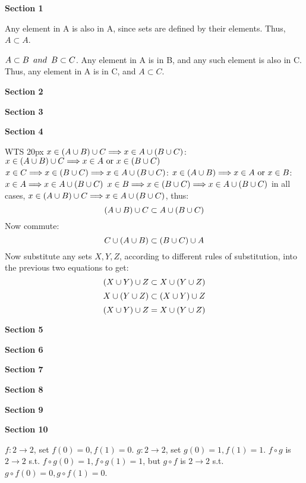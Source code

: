 \documentclass{article}
\DeclarePairedDelimiter\prn{(}{)}
\newcommand{\nl}[0]{\newline}
\begin{document}
\begin{flushleft}

\centerline{\textbf{Section 1}}
 \nl
Any element in A is also in A, since sets are defined by their elements. Thus, $A \subset A$. \nl

$A \subset B \kern5px and \kern5px B \subset C$. Any element in A is in B, and any such element is also in C. Thus, any element in A is in C, and $A \subset C$. \nl

\centerline{\textbf{Section 2}}
 \nl

\centerline{\textbf{Section 3}}

\centerline{\textbf{Section 4}}
 \nl
WTS \kern20px $x \in \prn*{A \cup B} \cup C \Longrightarrow x \in A \cup \prn*{B \cup C}$: \nl \nl
$x \in \prn*{A \cup B} \cup C \Longrightarrow x \in A \text{ or } x \in \prn*{B \cup C}$ \nl
\hspace*{50px} $x \in C \Longrightarrow x \in \prn*{B \cup C} \Longrightarrow x \in A \cup \prn*{B \cup C}$: \nl
\hspace*{50px} $x \in \prn*{A \cup B} \Longrightarrow x \in A \text{ or } x \in B$: \nl
\hspace*{100px} $x \in A \Longrightarrow x \in A \cup \prn*{B \cup C}$ \nl
\hspace*{100px} $x \in B \Longrightarrow x \in \prn*{B \cup C} \Longrightarrow x \in A \cup \prn*{B \cup C}$ \nl
in all cases, $x \in \prn*{A \cup B} \cup C \Longrightarrow x \in A \cup \prn*{B \cup C}$, thus:
$$\prn*{A \cup B} \cup C \subset A \cup \prn*{B \cup C}$$
Now commute:
$$C \cup \prn*{A \cup B} \subset \prn*{B \cup C} \cup A$$
Now substitute any sets $X, Y, Z$, according to different rules of substitution, into the previous two equations to get:
$$\prn*{X \cup Y} \cup Z \subset X \cup \prn*{Y \cup Z}$$
$$X \cup \prn*{Y \cup Z} \subset \prn*{X \cup Y} \cup Z$$
$$\prn*{X \cup Y} \cup Z = X \cup \prn*{Y \cup Z}$$

\centerline{\textbf{Section 5}}

\centerline{\textbf{Section 6}}

\centerline{\textbf{Section 7}}

\centerline{\textbf{Section 8}}

\centerline{\textbf{Section 9}}

\centerline{\textbf{Section 10}}

 \nl
$f: 2 \rightarrow 2$, set $f(0) = 0, f(1) = 0$. \nl
$g: 2 \rightarrow 2$, set $g(0) = 1, f(1) = 1$. \nl
$f\circ g$ is $2 \rightarrow 2$ s.t. $f \circ g(0) = 1, f \circ g (1) = 1$, but \nl
$g \circ f$ is $2 \rightarrow 2$ s.t. $g \circ f(0) = 0, g \circ f (1) = 0$. \nl 

\end{flushleft}
\end{document}

